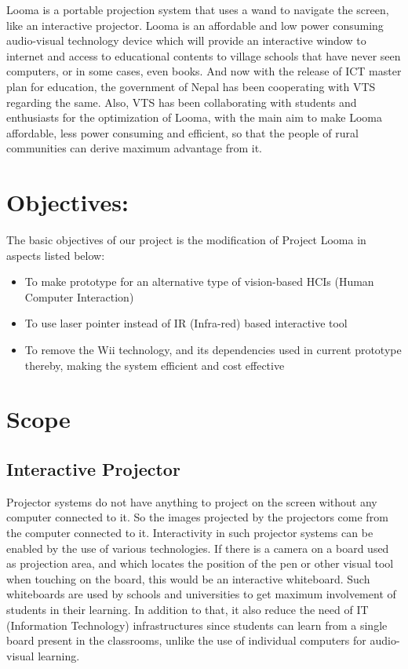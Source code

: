 \documentclass[12pt, a4paper]{article}
\begin{document}
Looma is a portable projection system that uses a wand to navigate the screen, like an interactive projector. Looma is an affordable and low power consuming audio-visual technology device which will provide an interactive window to internet and access to educational contents to village schools that have never seen computers, or in some cases, even books. And now with the release of ICT master plan for education, the government of Nepal has been cooperating with VTS regarding the same. Also, VTS has been collaborating with students and enthusiasts for the optimization of Looma, with the main aim to make Looma affordable, less power consuming and efficient, so that the people of rural communities can derive maximum advantage from it.  


\newpage

\section{Objectives:}

The basic objectives of our project is the modification of Project Looma in aspects listed below:

\begin{itemize}
	\item To make prototype for an alternative type of vision-based HCIs (Human Computer Interaction)
	\item To use laser pointer instead of IR (Infra-red) based interactive tool
	\item To remove the Wii technology, and its dependencies used in current prototype thereby, making the system efficient and cost effective
\end{itemize}

\newpage
\section{Scope}
\subsection{Interactive Projector}
Projector systems do not have anything to project on the screen without any computer connected to it. So the images projected by the projectors come from the computer connected to it. Interactivity in such projector systems can be enabled by the use of various technologies. If there is a camera on a board used as projection area, and which locates the position of the pen or other visual tool when touching on the board, this would be an interactive whiteboard. Such whiteboards are used by schools and universities to get maximum involvement of students in their learning. In addition to that, it also reduce the need of IT (Information Technology) infrastructures since students can learn from a single board present in the classrooms, unlike the use of individual computers for audio-visual learning.
\end{document}
